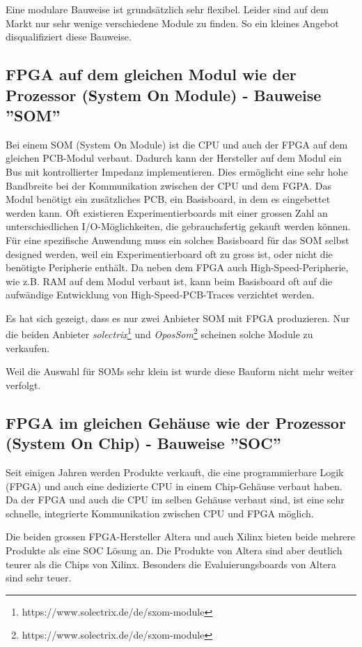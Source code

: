 Eine modulare Bauweise ist grundsätzlich sehr flexibel.
Leider sind auf dem Markt nur sehr wenige verschiedene Module zu finden.
So ein kleines Angebot disqualifiziert diese Bauweise.


\subsection{FPGA auf dem gleichen Modul wie der Prozessor (System On Module) - Bauweise ''SOM''}
Bei einem SOM (System On Module) ist die CPU und auch der FPGA auf dem gleichen PCB-Modul verbaut.
Dadurch kann der Hersteller auf dem Modul ein Bus mit kontrollierter Impedanz implementieren.
Dies ermöglicht eine sehr hohe Bandbreite bei der Kommunikation zwischen der CPU und dem FGPA.
Das Modul benötigt ein zusätzliches PCB, ein Basisboard, in dem es eingebettet werden kann.
Oft existieren Experimentierboards mit einer grossen Zahl an unterschiedlichen I/O-Möglichkeiten, die gebrauchsfertig gekauft werden können.
Für eine spezifische Anwendung muss ein solches Basisboard für das SOM selbst designed werden, weil ein Experimentierboard oft zu gross ist, oder nicht die benötigte Peripherie enthält.
Da neben dem FPGA auch High-Speed-Peripherie, wie z.B. RAM auf dem Modul verbaut ist, kann beim Basisboard oft auf die aufwändige Entwicklung von High-Speed-PCB-Traces verzichtet werden.

Es hat sich gezeigt, dass es nur zwei Anbieter SOM mit FPGA produzieren.
Nur die beiden Anbieter \textit{solectrix}\footnote{https://www.solectrix.de/de/sxom-module} und \textit{OposSom}\footnote{https://www.solectrix.de/de/sxom-module} scheinen solche Module zu verkaufen.

Weil die Auswahl für SOMs sehr klein ist wurde diese Bauform nicht mehr weiter verfolgt.

 
\subsection{FPGA im gleichen Gehäuse wie der Prozessor (System On Chip) - Bauweise ''SOC''}
Seit einigen Jahren werden Produkte verkauft, die eine programmierbare Logik (FPGA) und auch eine dedizierte CPU in einem Chip-Gehäuse verbaut haben.
Da der FPGA und auch die CPU im selben Gehäuse verbaut sind, ist eine sehr schnelle, integrierte Kommunikation zwischen CPU und FPGA möglich.

Die beiden grossen FPGA-Hersteller Altera und auch Xilinx bieten beide mehrere Produkte als eine SOC Lösung an.
Die Produkte von Altera sind aber deutlich teurer als die Chips von Xilinx.
Besonders die Evaluierungsboards von Altera sind sehr teuer.

